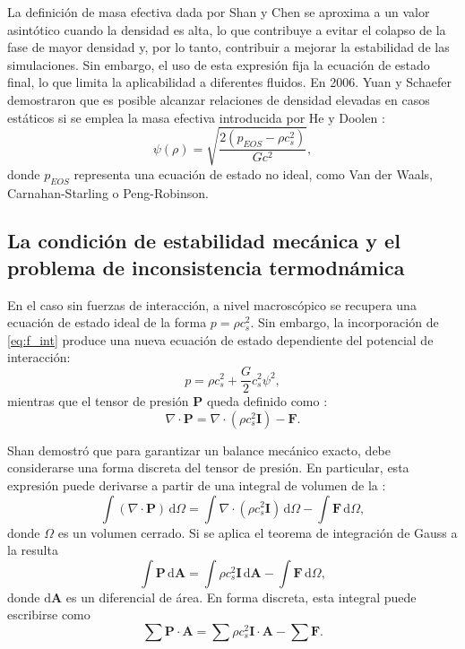 La definici\'on de masa efectiva dada por Shan y Chen se aproxima a un valor asint\'otico cuando la densidad es alta, lo que contribuye a evitar el colapso de la fase de mayor densidad y, por lo tanto, contribuir a mejorar la estabilidad de las simulaciones. Sin embargo, el uso de esta expresi\'on fija la ecuaci\'on de estado final, lo que limita la aplicabilidad a diferentes fluidos. En 2006. Yuan y Schaefer \cite{yuan_equations_2006} demostraron que es posible alcanzar relaciones de densidad elevadas en casos est\'aticos si se emplea la masa efectiva introducida por He y Doolen \cite{he_thermodynamic_2002}:
\begin{equation}
	\psi(\rho) = \sqrt{\dfrac{2(p_{EOS} - \rho c_s^2)}{Gc^2}},
\end{equation}
donde $p_{EOS}$ representa una ecuaci\'on de estado no ideal, como Van der Waals, Carnahan-Starling o Peng-Robinson.






\subsection{La condici\'on de estabilidad mec\'anica y el problema de inconsistencia termodn\'amica}

En el caso sin fuerzas de interacci\'on, a nivel macrosc\'opico se recupera una ecuaci\'on de estado ideal de la forma $p=\rho c_s^2$. Sin embargo, la incorporaci\'on de \ref{eq:f_int} produce una nueva ecuaci\'on de estado dependiente del potencial de interacci\'on:
\begin{equation}
	p = \rho c_s^2 + \dfrac{G}{2} c_s^2 \psi ^2,
\end{equation}
mientras que el tensor de presi\'on $\bm{P}$ queda definido como \cite{he_thermodynamic_2002}:
\begin{equation}
	\nabla \cdot \bm{P} = \nabla \cdot (\rho c_s^2 \bm{I}) - \bm{F}.
	\label{eq:ptens}
\end{equation}

Shan \cite{shan_pressure_2008} demostr\'o que para garantizar un balance mec\'anico exacto, debe considerarse una forma discreta del tensor de presi\'on. En particular, esta expresi\'on puede derivarse a partir de una integral de volumen de la :
\begin{equation}
	\int (\nabla \cdot \bm{P}) \, \mbox{d}\Omega = \int \nabla \cdot (\rho c_s^2 \bm{I})\, \mbox{d}\Omega - \int \bm{F} \, \mbox{d}\Omega,
	\label{eq:integral_pres}
\end{equation}
donde $\Omega$ es un volumen cerrado. Si se aplica el teorema de integraci\'on de Gauss a la  resulta
\begin{equation}
	\int \bm{P} \, \mbox{d} \bm{A} = \int \rho c_s^2 \bm{I}\, \mbox{d} \bm{A} - \int \bm{F} \, \mbox{d}\Omega,
\end{equation}
donde $\mbox{d} \bm{A}$ es un diferencial de \'area. En forma discreta, esta integral puede escribirse como
\begin{equation}
	\sum \bm{P} \cdot \bm{A} = \sum \rho c_s^2 \bm{I} \cdot \bm{A} - \sum \bm{F}.
\end{equation}

